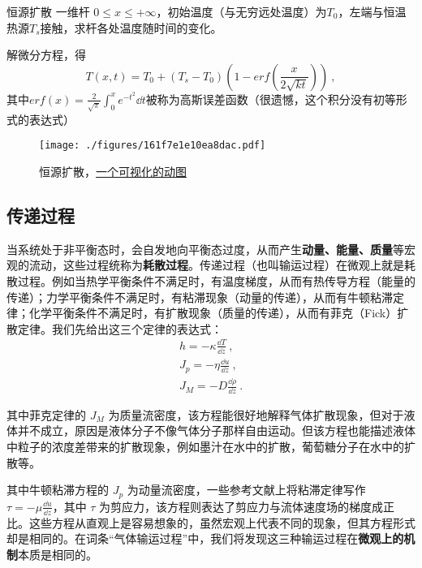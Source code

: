 \begin{example}{恒源扩散}
一维杆 $0\le x\le +\infty$，初始温度（与无穷远处温度）为$T_0$，左端与恒温热源$T_s$接触，求杆各处温度随时间的变化。

解微分方程，得
\begin{equation}
T(x,t)=T_0+(T_s-T_0)\left(1-erf\left(\frac{x}{2\sqrt{kt}}\right)\right)~,
\end{equation}
其中$erf(x)=\frac{2}{\sqrt{\pi}}\int^x_0 e^{-t^2} \dd t$被称为高斯误差函数（很遗憾，这个积分没有初等形式的表达式）

\begin{figure}[ht]
\centering
\texttt{[image: ./figures/161f7e1e10ea8dac.pdf]}
\caption{恒源扩散，\href{https://wuli.wiki/apps/diffus.html}{一个可视化的动图}} \label{fig_heatc_1}
\end{figure}
\end{example}

\subsection{传递过程}
当系统处于非平衡态时，会自发地向平衡态过度，从而产生\textbf{动量、能量、质量}等宏观的流动，这些过程统称为\textbf{耗散过程}。传递过程（也叫输运过程）在微观上就是耗散过程。例如当热学平衡条件不满足时，有温度梯度，从而有热传导方程（能量的传递）；力学平衡条件不满足时，有粘滞现象（动量的传递），从而有牛顿粘滞定律；化学平衡条件不满足时，有扩散现象（质量的传递），从而有菲克（Fick）扩散定律。我们先给出这三个定律的表达式：
\begin{align}
h=-\kappa \frac{\dd T}{\dd z}~,\\
J_p=-\eta \frac{\dd u}{\dd z}~,\\
J_M=-D\frac{\dd \rho}{\dd z}~.
\end{align}

其中菲克定律的 $J_M$ 为质量流密度，该方程能很好地解释气体扩散现象，但对于液体并不成立，原因是液体分子不像气体分子那样自由运动。但该方程也能描述液体中粒子的浓度差带来的扩散现象，例如墨汁在水中的扩散，葡萄糖分子在水中的扩散等。

其中牛顿粘滞方程的 $J_p$ 为动量流密度，一些参考文献上将粘滞定律写作 $\tau = -\mu \frac{\dd u}{\dd z}$，其中 $\tau$ 为剪应力，该方程则表达了剪应力与流体速度场的梯度成正比。这些方程从直观上是容易想象的，虽然宏观上代表不同的现象，但其方程形式却是相同的。在词条“气体输运过程”中，我们将发现这三种输运过程在\textbf{微观上的机制}本质是相同的。

